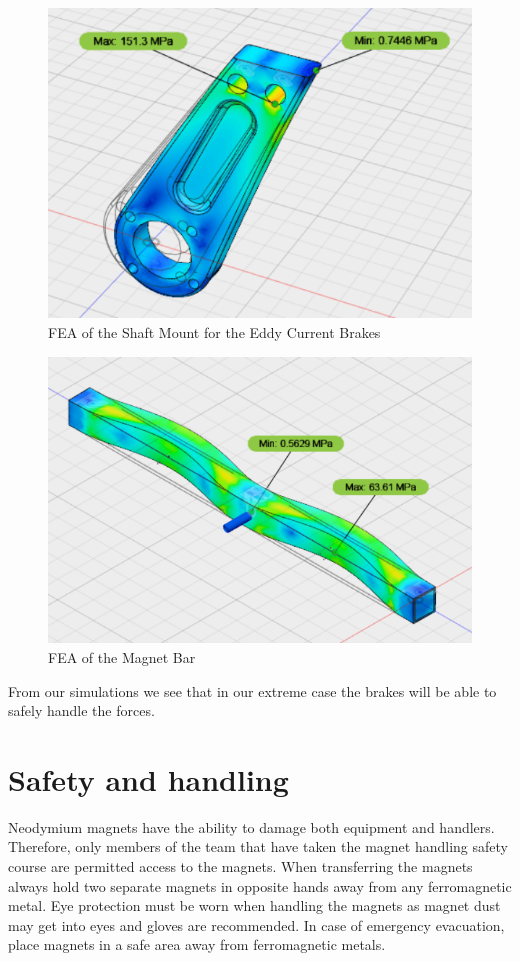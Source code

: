 \documentclass[main.tex]{subfiles}
\begin{document}
    \begin{figure}
    	\centering
        \includegraphics[width = \linewidth]{images/ShaftMount}
        \caption{FEA of the Shaft Mount for the Eddy Current Brakes}
        \label{fig:ShafttMount}
    \end{figure}
    \begin{figure}
    	\centering
        \includegraphics[width=\linewidth]{images/MagnetBarFEA}
        \caption{FEA of the Magnet Bar}
        \label{fig:MagnetBar}
    \end{figure}
    From our simulations we see that in our extreme case the brakes will be able to safely handle the forces.\\

    \section{Safety and handling}
    Neodymium magnets have the ability to damage both equipment and handlers. Therefore, only members of the team that have taken the magnet handling safety course are permitted access to the magnets. When transferring the magnets always hold two separate magnets in opposite hands away from any ferromagnetic metal. Eye protection must be worn when handling the magnets as magnet dust may get into eyes and gloves are recommended. In case of emergency evacuation, place magnets in a safe area away from ferromagnetic metals.
\end{document}
